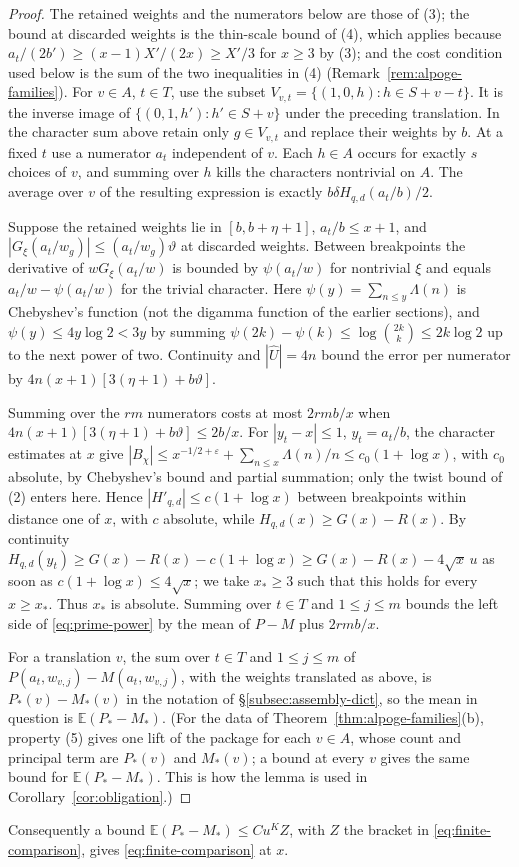 \documentclass[10pt]{amsart}
\theoremstyle{definition}
\theoremstyle{remark}
\begin{document}
\begin{proof}
The retained weights and the numerators below are those of (3); the bound
at discarded weights is the thin-scale bound of (4), which applies because
$a_t/(2b')\ge(x-1)X'/(2x)\ge X'/3$ for $x\ge3$ by (3); and the cost
condition used below is the sum of the two inequalities in (4)
(Remark~\ref{rem:alpoge-families}).
For $v\in A$, $t\in T$, use the subset
$V_{v,t}=\{(1,0,h):h\in S+v-t\}$. It is the inverse image of
$\{(0,1,h'):h'\in S+v\}$ under the preceding translation.
In the character sum above
retain only $g\in V_{v,t}$ and replace their weights by $b$.
At a fixed $t$ use a numerator $a_t$ independent of $v$. Each
$h\in A$ occurs for exactly $s$ choices of $v$, and summing over
$h$ kills the characters nontrivial on $A$. The average over $v$
of the resulting expression is exactly
$b\delta H_{q,d}(a_t/b)/2$.

Suppose the retained weights lie in $[b,b+\eta+1]$, $a_t/b\le x+1$,
and $|G_\xi(a_t/w_g)|\le(a_t/w_g)\vartheta$ at discarded weights.
Between breakpoints the derivative of $wG_\xi(a_t/w)$ is bounded by
$\psi(a_t/w)$ for nontrivial $\xi$ and equals $a_t/w-\psi(a_t/w)$
for the trivial character. Here $\psi(y)=\sum_{n\le y}\Lambda(n)$ is Chebyshev's
function (not the digamma function of the earlier sections), and
$\psi(y)\le4y\log2<3y$ by summing
$\psi(2k)-\psi(k)\le\log\binom{2k}k\le2k\log2$ up to the next power
of two. Continuity and $|\widehat U|=4n$ bound the error per numerator
by $4n(x+1)[3(\eta+1)+b\vartheta]$.

Summing over the $rm$ numerators costs at most $2rmb/x$ when
$4n(x+1)[3(\eta+1)+b\vartheta]\le2b/x$. For $|y_t-x|\le1$,
$y_t=a_t/b$, the character estimates at $x$ give
$|B_\chi|\le x^{-1/2+\varepsilon}+\sum_{n\le x}\Lambda(n)/n
\le c_0(1+\log x)$, with $c_0$ absolute, by Chebyshev's bound and partial
summation; only the twist bound of (2) enters here. Hence
$|H'_{q,d}|\le c(1+\log x)$ between breakpoints within distance one of $x$,
with $c$ absolute, while $H_{q,d}(x)\ge G(x)-R(x)$. By continuity
$H_{q,d}(y_t)\ge G(x)-R(x)-c(1+\log x)\ge G(x)-R(x)-4\sqrt{x}\,u$ as soon
as $c(1+\log x)\le4\sqrt x$; we take $x_*\ge3$ such that this holds for
every $x\ge x_*$. Thus $x_*$ is absolute. Summing over
$t\in T$ and $1\le j\le m$ bounds the left side of \eqref{eq:prime-power}
by the mean of $P-M$ plus $2rmb/x$.

For a translation $v$, the sum over $t\in T$ and $1\le j\le m$ of
$P(a_t,w_{v,j})-M(a_t,w_{v,j})$, with the weights translated as above, is
$P_*(v)-M_*(v)$ in the notation of \S\ref{subsec:assembly-dict}, so the mean
in question is $\mathbb E(P_*-M_*)$. (For the data of
Theorem~\ref{thm:alpoge-families}(b), property (5) gives one lift of the
package for each $v\in A$, whose count and principal term are $P_*(v)$ and
$M_*(v)$; a bound at every $v$ gives the same bound for
$\mathbb E(P_*-M_*)$. This is how the lemma is used in
Corollary~\ref{cor:obligation}.)
\end{proof}
Consequently a bound $\mathbb E(P_*-M_*)\le Cu^KZ$, with $Z$ the bracket in
\eqref{eq:finite-comparison}, gives \eqref{eq:finite-comparison} at $x$.
\end{document}
